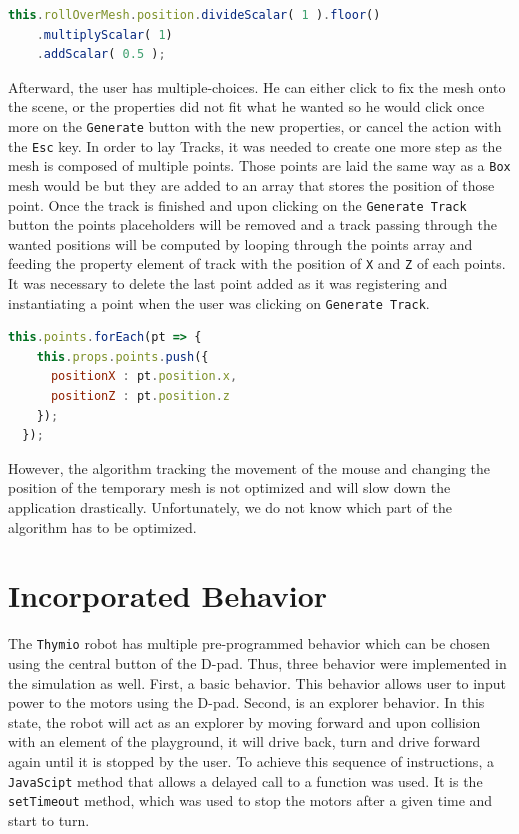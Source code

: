 \documentclass{scrreprt}
\begin{document}
\begin{lstlisting}[language=JavaScript, gobble=2, basicstyle=\ttfamily\small]
  this.rollOverMesh.position.divideScalar( 1 ).floor()
    .multiplyScalar( 1)
    .addScalar( 0.5 );
\end{lstlisting} 

Afterward, the user has multiple-choices. He can either click to fix the mesh onto the scene, or the properties did not fit what he wanted so he would click once more on the \texttt{Generate} button with the new properties, 
or cancel the action with the \texttt{Esc} key. 
In order to lay Tracks, it was needed to create one more step as the mesh is composed of multiple points. Those points are laid the same way as a \texttt{Box} mesh would be but they are added to an array that stores the position of those point. 
Once the track is finished and upon clicking on the \texttt{Generate Track} button the points placeholders will be removed and a track passing through the wanted positions will be computed by looping through the points array and feeding the property element of track with the position of \texttt{X} and \texttt{Z} of each points. 
It was necessary to delete the last point added as it was registering and instantiating a point when the user was clicking on \texttt{Generate Track}.

\begin{lstlisting}[language=JavaScript, gobble=2, basicstyle=\ttfamily\small]
  this.points.forEach(pt => {                      
    this.props.points.push({
      positionX : pt.position.x,
      positionZ : pt.position.z
    });
  });
\end{lstlisting} 

However, the algorithm tracking the movement of the mouse and changing the position of the temporary mesh is not optimized and will slow down the application drastically. Unfortunately, we do not know which part of the algorithm has to be optimized.

\section{Incorporated Behavior}

The \texttt{Thymio} robot has multiple pre-programmed behavior which can be chosen using the central button of the D-pad. Thus, three behavior were implemented in the simulation as well. First, a basic behavior. This behavior allows user to input power to the motors using the D-pad.
Second, is an explorer behavior. In this state, the robot will act as an explorer by moving forward and upon collision with an element of the playground, it will drive back, turn and drive forward again until it is stopped by the user.
To achieve this sequence of instructions, a \texttt{JavaScipt} method that allows a delayed call to a function was used. It is the \texttt{setTimeout} method, which was used to stop the motors after a given time and start to turn.
\end{document}
